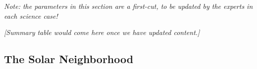 {\it Note: the parameters in this section are a first-cut, to be
  updated by the experts in each science case!}

{\it [Summary table would come here once we have updated content.]}



\subsection{The Solar Neighborhood}







